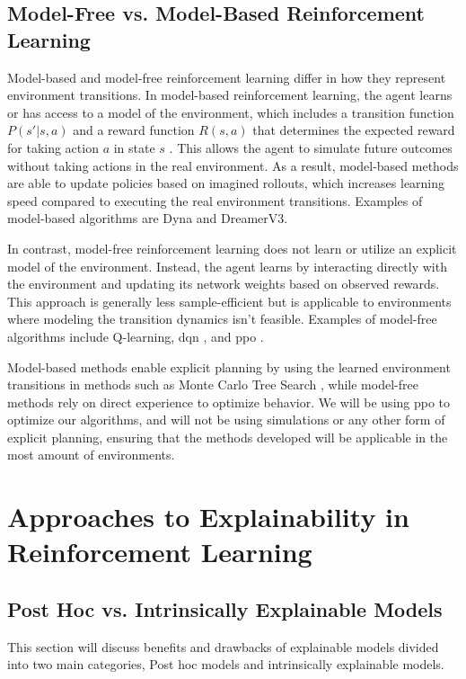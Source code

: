 \documentclass[UKenglish]{uiomasterthesis}
\begin{document}
\subsection{Model-Free vs. Model-Based Reinforcement Learning}

Model-based and model-free reinforcement learning differ in how they represent environment transitions. In model-based reinforcement learning, the agent learns or has access to a model of the environment, which includes a transition function \( P(s' | s, a) \) and a reward function \( R(s, a) \) that determines the expected reward for taking action \( a \) in state \( s \) \cite{moerland2022modelbasedreinforcementlearningsurvey}. This allows the agent to simulate future outcomes without taking actions in the real environment. As a result, model-based methods are able to update policies based on imagined rollouts, which increases learning speed compared to executing the real environment transitions. Examples of model-based algorithms are Dyna\cite{10.1145/122344.122377} and DreamerV3\cite{hafner2024masteringdiversedomainsworld}.

In contrast, model-free reinforcement learning does not learn or utilize an explicit model of the environment. Instead, the agent learns by interacting directly with the environment and updating its network weights based on observed rewards. This approach is generally less sample-efficient but is applicable to environments where modeling the transition dynamics isn't feasible. Examples of model-free algorithms include Q-learning, \ac{dqn} \cite{mnih2013playingatarideepreinforcement}, and \ac{ppo} \cite{schulman2017proximalpolicyoptimizationalgorithms}.

Model-based methods enable explicit planning by using the learned environment transitions in methods such as Monte Carlo Tree Search \cite{_wiechowski_2022}, while model-free methods rely on direct experience to optimize behavior. We will be using \ac{ppo} to optimize our algorithms, and will not be using simulations or any other form of explicit planning, ensuring that the methods developed will be applicable in the most amount of environments.


\section{Approaches to Explainability in Reinforcement Learning}
\subsection{Post Hoc vs. Intrinsically Explainable Models}
This section will discuss benefits and drawbacks of explainable models divided into two main categories, Post hoc models and intrinsically explainable models.
\end{document}
